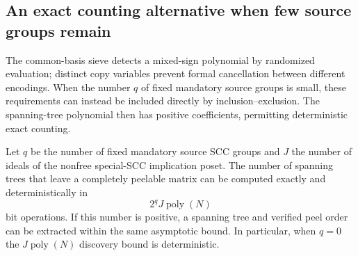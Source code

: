 \subsection{An exact counting alternative when few source groups remain}
\label{sec:kirchhoff-sieve}

The common-basis sieve detects a mixed-sign polynomial by randomized
evaluation; distinct copy variables prevent formal cancellation between
different encodings.  When the number $q$ of fixed
mandatory source groups is small, these requirements can instead be
included directly by inclusion--exclusion.  The spanning-tree polynomial
then has positive coefficients, permitting deterministic exact counting.

\begin{theorem}\label{thm:kirchhoff-sieve}
Let $q$ be the number of fixed mandatory source SCC groups and $J$ the
number of ideals of the nonfree special-SCC implication poset.  The number
of spanning trees that leave a completely peelable matrix can be computed
exactly and deterministically in
\[
                       2^q J\operatorname{poly}(N)
\]
bit operations.  If this number is positive, a spanning tree and verified
peel order can be extracted within the same asymptotic bound.  In particular,
when $q=0$ the $J\operatorname{poly}(N)$ discovery bound is deterministic.
\end{theorem}
